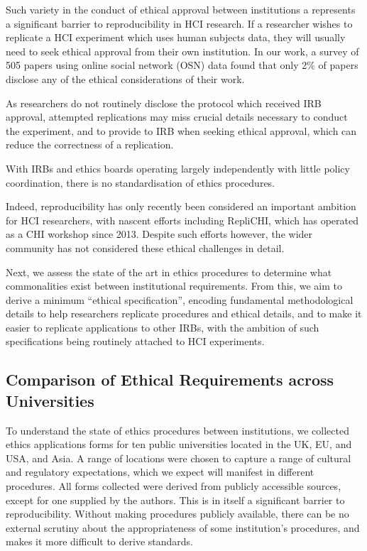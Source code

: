 Such variety in the conduct of ethical approval between institutions a
represents a significant barrier to reproducibility in HCI research. If a
researcher wishes to replicate a HCI experiment which uses human subjects
data, they will usually need to seek ethical approval from their own
institution. In our work, a survey of 505 papers using online social network
(OSN) data found that only 2\% of papers disclose any of the ethical
considerations of their work.


As researchers do not routinely disclose the protocol which
received IRB approval, attempted replications may miss crucial details
necessary to conduct the experiment, and to provide to IRB when seeking
ethical approval, which can reduce the correctness of a replication.

With IRBs and ethics boards operating largely independently with little policy
coordination, there is no standardisation of ethics procedures.

Indeed, reproducibility has only recently been considered an important
ambition for HCI researchers, with nascent efforts including RepliCHI, which
has operated as a CHI workshop since 2013. Despite such efforts however, the
wider community has not considered these ethical challenges in detail.

Next, we assess the state of the art in ethics procedures to determine what
commonalities exist between institutional requirements. From this, we aim to
derive a minimum ``ethical specification'', encoding fundamental
methodological details to help researchers replicate procedures and ethical
details, and to make it easier to replicate applications to other IRBs, with
the ambition of such specifications being routinely attached to HCI
experiments.


\subsection{Comparison of Ethical Requirements across Universities}

To understand the state of ethics procedures between institutions, we
collected ethics applications forms for ten public universities located in the
UK, EU, and USA, and Asia. A range of locations were chosen to capture a range of
cultural and regulatory expectations, which we expect will manifest in
different procedures. All forms collected were derived from publicly
accessible sources, except for one supplied by the authors. This is in
itself a significant barrier to reproducibility. Without making procedures publicly 
available, there can be no external scrutiny about the appropriateness of some institution's
procedures, and makes it more difficult to derive standards.

